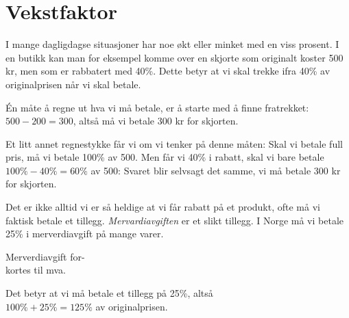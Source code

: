 \section{Vekstfaktor \label{vekstfaktor}}
I mange dagligdagse situasjoner har noe økt eller minket med en viss prosent. I en butikk kan man for eksempel komme over en skjorte som originalt koster 500 kr, men som er rabbatert med 40\%. Dette betyr at vi skal trekke ifra 40\% av originalprisen når vi skal betale.\vsk

Én måte å regne ut hva vi må betale, er å starte med å finne fratrekket:
$ {500-200=300 }$, altså må vi betale 300 kr for skjorten.\vsk

Et litt annet regnestykke får vi om vi tenker på denne måten: Skal vi betale full pris, må vi betale 100\% av 500. Men får vi 40\% i rabatt, skal vi bare betale ${100\%-40\%=60\%}$ av 500:
Svaret blir selvsagt det samme, vi må betale 300 kr for skjorten.\vsk

\parbox[l][][l]{0.6\linewidth}{Det er ikke alltid vi er så heldige at vi får rabatt på et produkt, ofte må vi faktisk betale et tillegg. \textit{Mervardiavgiften} er et slikt tillegg. I Norge må vi betale 25\% i merverdiavgift på mange varer.\vspace{1pt}}\qquad
\parbox[r][][l]{0.3\linewidth}{\begin{shaded}
	Merverdiavgift for-\\kortes til mva.
	\end{shaded}
	}
Det betyr at vi må betale et tillegg på 25\%, altså \\ $100\%+25\%=125\%$ av originalprisen.\vsk

